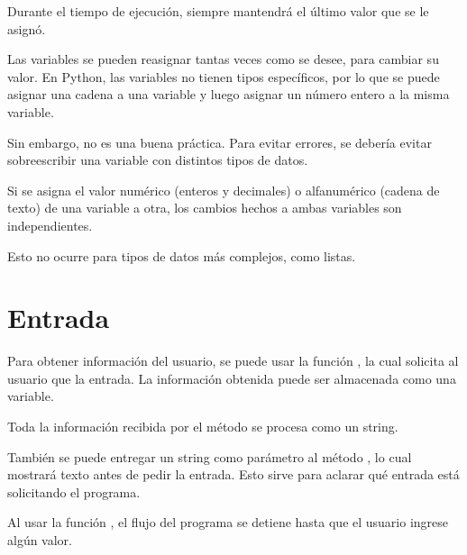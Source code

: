 
Durante el tiempo de ejecución, siempre mantendrá el último valor que se le asignó.


Las variables se pueden reasignar tantas veces como se desee, para cambiar su valor.
En Python, las variables no tienen tipos específicos, por lo que se puede asignar una cadena a una variable y luego asignar un número entero a la misma variable.


Sin embargo, no es una buena práctica.
Para evitar errores, se debería evitar sobreescribir una variable con distintos tipos de datos.

Si se asigna el valor numérico (enteros y decimales) o alfanumérico (cadena de texto) de una variable a otra, los cambios hechos a ambas variables son independientes.


Esto no ocurre para tipos de datos más complejos, como listas.

\section{Entrada}

Para obtener información del usuario, se puede usar la función , la cual solicita al usuario que la entrada.
La información obtenida puede ser almacenada como una variable.


Toda la información recibida por el método  se procesa como un string.

También se puede entregar un string como parámetro al método , lo cual mostrará texto antes de pedir la entrada.
Esto sirve para aclarar qué entrada está solicitando el programa.


Al usar la función , el flujo del programa se detiene hasta que el usuario ingrese algún valor.

